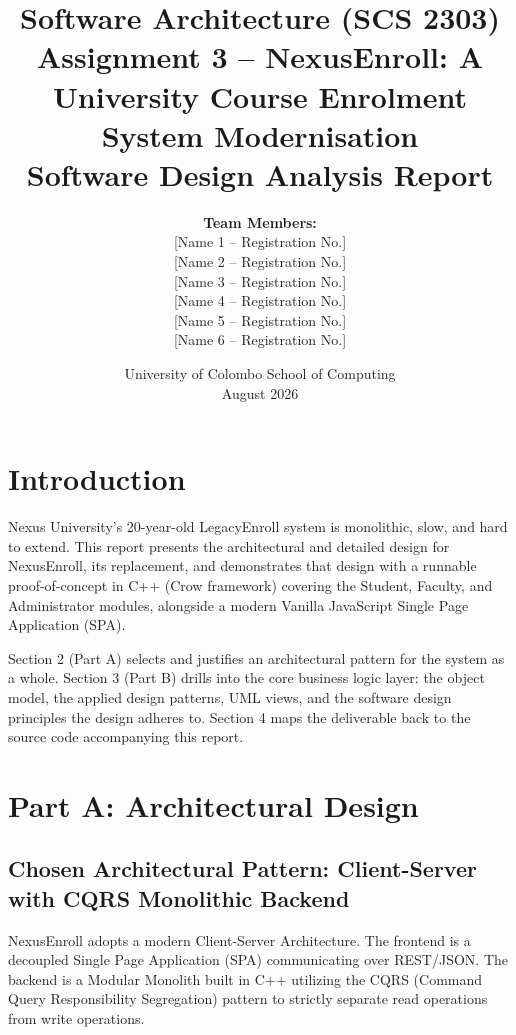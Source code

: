 \documentclass[12pt,a4paper]{article}
\title{Software Architecture (SCS 2303)\\ Assignment 3 – NexusEnroll: A University Course Enrolment System Modernisation\\ Software Design Analysis Report}
\author{
\textbf{Team Members:}\\
{[Name 1 – Registration No.]}\\
{[Name 2 – Registration No.]}\\
{[Name 3 – Registration No.]}\\
{[Name 4 – Registration No.]}\\
{[Name 5 – Registration No.]}\\
{[Name 6 – Registration No.]}
}
\date{University of Colombo School of Computing\\August 2026}
\begin{document}
\maketitle

\tableofcontents
\newpage

\section{Introduction}
Nexus University's 20-year-old LegacyEnroll system is monolithic, slow, and hard to extend. This report presents the architectural and detailed design for NexusEnroll, its replacement, and demonstrates that design with a runnable proof-of-concept in C++ (Crow framework) covering the Student, Faculty, and Administrator modules, alongside a modern Vanilla JavaScript Single Page Application (SPA).

Section 2 (Part A) selects and justifies an architectural pattern for the system as a whole. Section 3 (Part B) drills into the core business logic layer: the object model, the applied design patterns, UML views, and the software design principles the design adheres to. Section 4 maps the deliverable back to the source code accompanying this report.

\section{Part A: Architectural Design}
\subsection{Chosen Architectural Pattern: Client-Server with CQRS Monolithic Backend}
NexusEnroll adopts a modern Client-Server Architecture. The frontend is a decoupled Single Page Application (SPA) communicating over REST/JSON. The backend is a Modular Monolith built in C++ utilizing the CQRS (Command Query Responsibility Segregation) pattern to strictly separate read operations from write operations.
\end{document}
